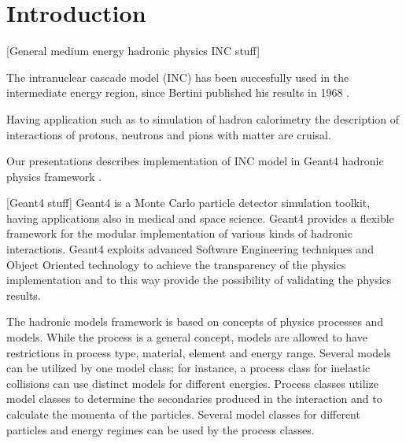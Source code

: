 \section{Introduction}

[General medium energy hadronic physics INC stuff]

The intranuclear cascade model (INC) has been succesfully used in the intermediate energy region, 
since Bertini published his results in 1968 \cite{bertini68}.

Having application such as to simulation of hadron calorimetry the description of interactions of protons, neutrons and pions with matter are cruisal.

Our presentations describes implementation of INC model in {\sc Geant4} hadronic physics framework \cite{}.

[Geant4 stuff]
Geant4 is a Monte Carlo particle detector simulation toolkit, having applications also in  medical and space
science. 
Geant4 provides a flexible framework for the modular implementation of
various kinds of hadronic interactions. 
Geant4 exploits advanced Software Engineering techniques and Object
Oriented technology to achieve the transparency of the physics
implementation and to this way provide the possibility of validating the
physics results. 

The hadronic models framework is based on concepts of physics
processes and models. While the process is a general concept, models
are allowed to have restrictions in process type, material, element
and energy range.  Several models can be utilized by one model class; for instance, a
process class for inelastic collisions can use distinct models for different energies.
Process classes utilize model classes to determine the
secondaries produced in the interaction and to calculate the momenta
of the particles.  Several model classes for different particles and
energy regimes can be used by the process classes.




